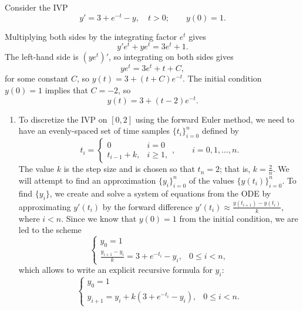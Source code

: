 \documentclass{homework}
\begin{document}
	\maketitle
	
	\question 
	
	Consider the IVP
	\begin{equation}
		y' = 3 + e^{-t} - y, \quad t > 0; \qquad y(0) = 1.
	\end{equation}
	
	\begin{arabicparts}
		\questionpart Multiplying both sides by the integrating factor $e^t$ gives
		\begin{equation}
			y'e^t + ye^t = 3e^t + 1.
		\end{equation}
		The left-hand side is $(ye^t)'$, so integrating on both sides gives
		\begin{equation}
			ye^t = 3e^t + t + C,
		\end{equation}
		for some constant $C$, so $y(t) = 3 + (t + C)e^{-t}$. The initial condition $y(0) = 1$ implies that $C = -2$, so
		\begin{equation}
			y(t) = 3 + (t-2)e^{-t}.
		\end{equation}
		
		\questionpart
		\begin{enumerate}[label=({\bf\alph*})]
			\item To discretize the IVP on $[0,2]$ using the forward Euler method, we need to have an evenly-spaced set of time samples $\{t_i\}_{i=0}^n$ defined by
			\begin{equation}
				t_i = \begin{cases}
					0 & i = 0 \\
					t_{i-1} + k, & i \ge 1,
				\end{cases}, \qquad i = 0,1,\dots,n.
			\end{equation}
			The value $k$ is the step size and is chosen so that $t_n = 2$; that is, $k = \frac{2}{n}$. We will attempt to find an approximation $\{y_i\}_{i=0}^n$ of the values $\{y(t_i)\}_{i=0}^n$. To find $\{y_i\}$, we create and solve a system of equations from the ODE by approximating $y'(t_i)$ by the forward difference $y'(t_i) \approx \frac{y(t_{i+1}) - y(t_i)}{k}$, where $i < n$. Since we know that $y(0) = 1$ from the initial condition, we are led to the scheme
			\begin{equation}
				\begin{cases}
					y_0 = 1 &\\
					\frac{y_{i+1} - y_i}{k} = 3 + e^{-t_i} - y_i, & 0\le i < n,
				\end{cases}
			\end{equation}
			which allows to write an explicit recursive formula for $y_i$:
			\begin{equation}
				\begin{cases}
					y_0 = 1 &\\
					y_{i+1} = y_i + k(3 + e^{-t_i} - y_i), & 0\le i < n.
				\end{cases}
			\end{equation}
			

\end{enumerate}
\end{arabicparts}
\end{document}
